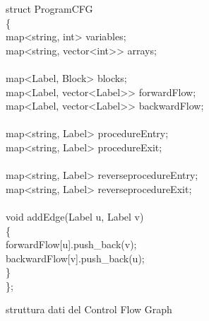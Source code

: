 \documentclass{article}
\theoremstyle{plain}
\theoremstyle{definition}
\theoremstyle{plain}
\begin{document}
\begin{figure}[h]
    \centering
    \begin{minipage}{0.95\textwidth}
        \ttfamily 
        struct ProgramCFG \\
        \{ \hspace*{15.5em} \\
        \hspace*{1em} map<string, int> variables; \\
        \hspace*{1em} map<string, vector<int>> arrays;\\
        \\
        \hspace*{1em} map<Label, Block> blocks;\\
        \hspace*{1em} map<Label, vector<Label>> forwardFlow; \\
        \hspace*{1em} map<Label, vector<Label>> backwardFlow;\\
        \\
        \hspace*{1em} map<string, Label> procedureEntry;\\
        \hspace*{1em} map<string, Label> procedureExit; \\
        \\
        \hspace*{1em} map<string, Label> reverseprocedureEntry; \\
        \hspace*{1em} map<string, Label> reverseprocedureExit;\\
        \\
        \hspace*{1em} void addEdge(Label u, Label v) \\
        \hspace*{1em} \{ \\
        \hspace*{2em} forwardFlow[u].push\_back(v); \\
        \hspace*{2em} backwardFlow[v].push\_back(u); \\
        \hspace*{1em} \} \\
        \}; \\
    \end{minipage}
    \caption{struttura dati del Control Flow Graph}
    \label{fig:programcfg}
\end{figure}
\end{document}

